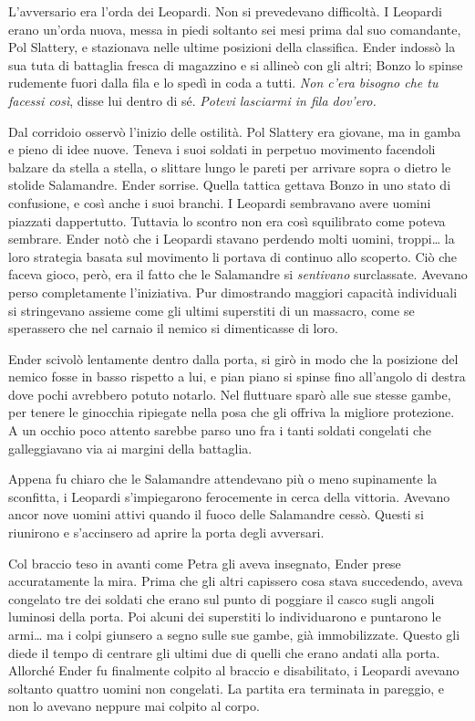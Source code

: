 {L'avversario era l'orda dei Leopardi. Non si prevedevano difficoltà. I
	Leopardi erano un'orda nuova, messa in piedi soltanto sei mesi prima dal
	suo comandante, Pol Slattery, e stazionava nelle ultime posizioni della
	classifica. Ender indossò la sua tuta di battaglia fresca di magazzino e
	si allineò con gli altri; Bonzo lo spinse rudemente fuori dalla fila e
	lo spedì in coda a tutti. \emph{Non c'era bisogno che tu facessi così},
	\emph{} disse lui dentro di sé. \emph{Potevi lasciarmi in fila
		dov'ero.}}

{Dal corridoio osservò l'inizio delle ostilità. Pol Slattery era
	giovane, ma in gamba e pieno di idee nuove. Teneva i suoi soldati in
	perpetuo movimento facendoli balzare da stella a stella, o slittare
	lungo le pareti per arrivare sopra o dietro le stolide Salamandre. Ender
	sorrise. Quella tattica gettava Bonzo in uno stato di confusione, e così
	anche i suoi branchi. I Leopardi sembravano avere uomini piazzati
	dappertutto. Tuttavia lo scontro non era così squilibrato come poteva
	sembrare. Ender notò che i Leopardi stavano perdendo molti uomini,
	troppi\ldots{} la loro strategia basata sul movimento li portava di
	continuo allo scoperto. Ciò che faceva gioco, però, era il fatto che le
	Salamandre si \emph{sentivano} surclassate. Avevano perso completamente
	l'iniziativa. Pur dimostrando maggiori capacità individuali si
	stringevano assieme come gli ultimi superstiti di un massacro, come se
	sperassero che nel carnaio il nemico si dimenticasse di loro.}

{Ender scivolò lentamente dentro dalla porta, si girò in modo che la
	posizione del nemico fosse in basso rispetto a lui, e pian piano si
	spinse fino all'angolo di destra dove pochi avrebbero potuto notarlo.
	Nel fluttuare sparò alle sue stesse gambe, per tenere le ginocchia
	ripiegate nella posa che gli offriva la migliore protezione. A un occhio
	poco attento sarebbe parso uno fra i tanti soldati congelati che
	galleggiavano via ai margini della battaglia.}

{Appena fu chiaro che le Salamandre attendevano più o meno supinamente
	la sconfitta, i Leopardi s'impiegarono ferocemente in cerca della
	vittoria. Avevano ancor nove uomini attivi quando il fuoco delle
	Salamandre cessò. Questi si riunirono e s'accinsero ad aprire la porta
	degli avversari.}

{Col braccio teso in avanti come Petra gli aveva insegnato, Ender prese
	accuratamente la mira. Prima che gli altri capissero cosa stava
	succedendo, aveva congelato tre dei soldati che erano sul punto di
	poggiare il casco sugli angoli luminosi della porta. Poi alcuni dei
	superstiti lo individuarono e puntarono le armi\ldots{} ma i colpi
	giunsero a segno sulle sue gambe, già immobilizzate. Questo gli diede il
	tempo di centrare gli ultimi due di quelli che erano andati alla porta.
	Allorché Ender fu finalmente colpito al braccio e disabilitato, i
	Leopardi avevano soltanto quattro uomini non congelati. La partita era
	terminata in pareggio, e non lo avevano neppure mai colpito al corpo.}


